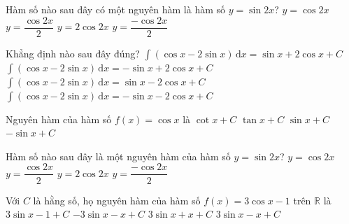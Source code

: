 

\begin{ex}%
	Hàm  số nào sau đây có một nguyên hàm là hàm số $ y=\sin 2x$?
	 \choice
		{$ y=\cos  2x$}
		{$ y=\dfrac{\cos  2x}{2}$}
		{\True $  y=2\cos 2x$}
		{$ y=\dfrac{-\cos 2x}{2}$} 
\end{ex}

\begin{ex}%
	 Khẳng định nào sau đây đúng?
	\choice 
		{\True $\displaystyle\int(\cos x-2\sin x)\mathrm{\,d}x=\sin  x+2\cos x+C$}
		{$\displaystyle\int(\cos x-2\sin x)\mathrm{\,d}x=-\sin  x+2\cos x+C$}
		{$\displaystyle\int(\cos x-2\sin x)\mathrm{\,d}x=\sin x-2\cos  x+C$}
		{$\displaystyle\int(\cos  x-2\sin x)\mathrm{\,d}x=-\sin x-2\cos x+C$}
\end{ex}

\begin{ex}%
	Nguyên  hàm của hàm số $f(x)=\cos x$ là
	\choice 
		{$\cot  x+C$}
		{$\tan  x+C$}
		 {\True $\sin x+C$}
		{$-\sin  x+C$}
\end{ex}

\begin{ex}%
	Hàm số nào sau đây là một nguyên hàm của  hàm số $ y=\sin 2x$?
	 \choice
		{$ y=\cos  2x$}
		{$  y=\dfrac{\cos 2x}{2}$}
		{$ y=2\cos 2x$} 
		{\True $ y=\dfrac{-\cos 2x}{2}$} 
\end{ex}

\begin{ex}%
	Với $C$ là hằng số, họ nguyên hàm của hàm số $f(x)=3\cos  x-1$ trên $\mathbb{R}$ là
	\choice 
		 {$3\sin x-1+C$}
		{$-3\sin  x-x+C$}
		{$3\sin  x+x+C$}
		{\True $3\sin x-x+C$} 
\end{ex}

